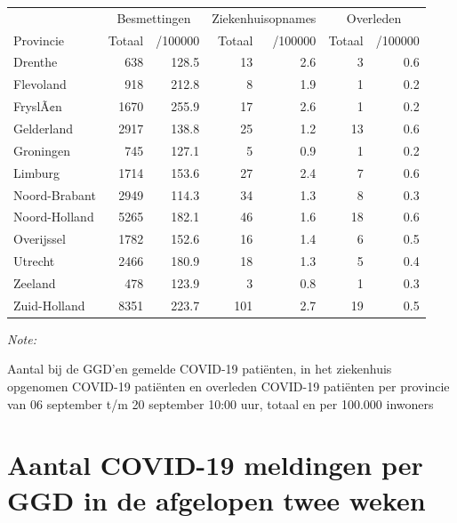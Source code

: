 \documentclass[
  english,
  man,floatsintext]{apa6}
\begin{document}
\begin{table}
\centering
\begin{threeparttable}
\begin{tabular}{lrrrrrr}
\toprule
\multicolumn{1}{c}{ } & \multicolumn{2}{c}{Besmettingen} & \multicolumn{2}{c}{Ziekenhuisopnames} & \multicolumn{2}{c}{Overleden} \\
\cmidrule(l{3pt}r{3pt}){2-3} \cmidrule(l{3pt}r{3pt}){4-5} \cmidrule(l{3pt}r{3pt}){6-7}
Provincie & Totaal & /100000 & Totaal & /100000 & Totaal & /100000\\
\midrule
Drenthe & 638 & 128.5 & 13 & 2.6 & 3 & 0.6\\
Flevoland & 918 & 212.8 & 8 & 1.9 & 1 & 0.2\\
FryslÃ¢n & 1670 & 255.9 & 17 & 2.6 & 1 & 0.2\\
Gelderland & 2917 & 138.8 & 25 & 1.2 & 13 & 0.6\\
Groningen & 745 & 127.1 & 5 & 0.9 & 1 & 0.2\\
Limburg & 1714 & 153.6 & 27 & 2.4 & 7 & 0.6\\
Noord-Brabant & 2949 & 114.3 & 34 & 1.3 & 8 & 0.3\\
Noord-Holland & 5265 & 182.1 & 46 & 1.6 & 18 & 0.6\\
Overijssel & 1782 & 152.6 & 16 & 1.4 & 6 & 0.5\\
Utrecht & 2466 & 180.9 & 18 & 1.3 & 5 & 0.4\\
Zeeland & 478 & 123.9 & 3 & 0.8 & 1 & 0.3\\
Zuid-Holland & 8351 & 223.7 & 101 & 2.7 & 19 & 0.5\\
\bottomrule
\end{tabular}
\begin{tablenotes}
\item \textit{Note: } 
\item Aantal bij de GGD’en gemelde COVID-19 patiënten, in het ziekenhuis opgenomen COVID-19 patiënten en overleden COVID-19 patiënten per provincie van 06 september t/m 20 september 10:00 uur, totaal en per 100.000 inwoners
\end{tablenotes}
\end{threeparttable}
\end{table}

\newpage

\hypertarget{aantal-covid-19-meldingen-per-ggd-in-de-afgelopen-twee-weken}{%
\section{Aantal COVID-19 meldingen per GGD in de afgelopen twee weken}\label{aantal-covid-19-meldingen-per-ggd-in-de-afgelopen-twee-weken}}
\end{document}

